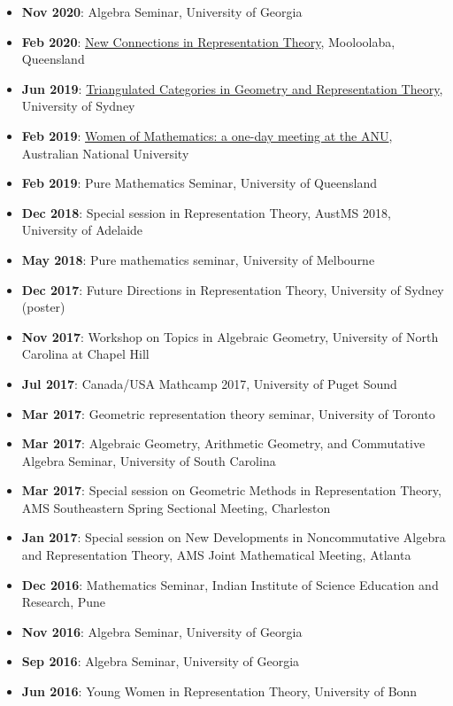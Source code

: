 \documentclass[a4paper]{moderncv}
\begin{document}
\begin{itemize}
\item \textbf{Nov 2020}: Algebra Seminar, University of Georgia
\item \textbf{Feb 2020}: \href{https://sites.google.com/view/mooloolaba2020/home}{New Connections in Representation Theory}, Mooloolaba, Queensland
\item \textbf{Jun 2019}: \href{https://sites.google.com/site/ausreptheory/workshop-2019}{Triangulated Categories in Geometry and Representation Theory}, University of Sydney
\item \textbf{Feb 2019}: \href{https://genderinstitute.anu.edu.au/women-mathematics-one-day-meeting-anu}{Women of Mathematics: a one-day meeting at the ANU}, Australian National University
\item \textbf{Feb 2019}: Pure Mathematics Seminar, University of Queensland
\item \textbf{Dec 2018}: Special session in Representation Theory, AustMS 2018, University of Adelaide
\item \textbf{May 2018}: Pure mathematics seminar, University of Melbourne
\item \textbf{Dec 2017}: Future Directions in Representation Theory, University of Sydney (poster)
\item \textbf{Nov 2017}: Workshop on Topics in Algebraic Geometry, University of North Carolina at Chapel Hill
\item \textbf{Jul 2017}: Canada/USA Mathcamp 2017, University of Puget Sound
\item \textbf{Mar 2017}: Geometric representation theory seminar, University of Toronto
\item \textbf{Mar 2017}: Algebraic Geometry, Arithmetic Geometry, and Commutative Algebra Seminar, University of South Carolina
\item \textbf{Mar 2017}: Special session on Geometric Methods in Representation Theory, AMS Southeastern Spring Sectional Meeting, Charleston
\item \textbf{Jan 2017}: Special session on New Developments in Noncommutative Algebra and Representation Theory, AMS Joint Mathematical Meeting, Atlanta
\item \textbf{Dec 2016}: Mathematics Seminar, Indian Institute of Science Education and Research, Pune
\item \textbf{Nov 2016}: Algebra Seminar, University of Georgia
\item \textbf{Sep 2016}: Algebra Seminar, University of Georgia
\item \textbf{Jun 2016}: Young Women in Representation Theory, University of Bonn

\end{itemize}
\end{document}
